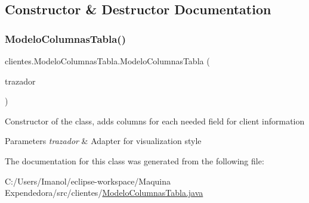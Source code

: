 \subsection{Constructor \& Destructor Documentation}
\mbox{\label{classclientes_1_1_modelo_columnas_tabla_a459144165e8e786dea691bf1a3beeebb}} 
\subsubsection{\texorpdfstring{Modelo\+Columnas\+Tabla()}{ModeloColumnasTabla()}}
{\footnotesize\ttfamily clientes.\+Modelo\+Columnas\+Tabla.\+Modelo\+Columnas\+Tabla (\begin{DoxyParamCaption}\item[{\mbox{\hyperlink{classclientes_1_1_trazador_tabla}{Trazador\+Tabla}}}]{trazador }\end{DoxyParamCaption})}

Constructor of the class, adds columns for each needed field for client information 
\begin{DoxyParams}{Parameters}
{\em trazador} & Adapter for visualization style \\
\hline
\end{DoxyParams}


The documentation for this class was generated from the following file\+:\begin{DoxyCompactItemize}
\item 
C\+:/\+Users/\+Imanol/eclipse-\/workspace/\+Maquina Expendedora/src/clientes/\mbox{\hyperlink{_modelo_columnas_tabla_8java}{Modelo\+Columnas\+Tabla.\+java}}\end{DoxyCompactItemize}
